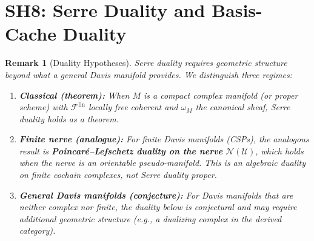 \documentclass[11pt,letterpaper]{article}
\newtheorem{remark}[conjecture]{Remark}
\newcommand{\sheaf}{\mathcal{F}}
\newcommand{\cover}{\mathcal{U}}
\newcommand{\nerve}{\mathcal{N}}
\begin{document}
\section{SH8: Serre Duality and Basis-Cache Duality}

\begin{remark}[Duality Hypotheses]\label{rem:serre_hypotheses}
Serre duality requires geometric structure beyond what a general Davis 
manifold provides. We distinguish three regimes:
\begin{enumerate}
    \item \textbf{Classical (theorem):} When $M$ is a compact complex 
    manifold (or proper scheme) with $\sheaf^{\mathrm{lin}}$ locally 
    free coherent and $\omega_M$ the canonical sheaf, Serre duality 
    holds as a theorem.
    \item \textbf{Finite nerve (analogue):} For finite Davis manifolds 
    (CSPs), the analogous result is \textbf{Poincar\'{e}--Lefschetz 
    duality on the nerve} $\nerve(\cover)$, which holds when the nerve 
    is an orientable pseudo-manifold. This is an algebraic duality on 
    finite cochain complexes, not Serre duality proper.
    \item \textbf{General Davis manifolds (conjecture):} For Davis 
    manifolds that are neither complex nor finite, the duality below 
    is \emph{conjectural} and may require additional geometric 
    structure (e.g., a dualizing complex in the derived category).
\end{enumerate}
\end{remark}
\end{document}
